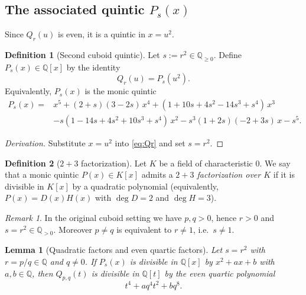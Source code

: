 \documentclass[12pt]{article}
\newtheorem{lemma}{Lemma}
\theoremstyle{remark}
\newtheorem{remark}{Remark}
\theoremstyle{definition}
\newtheorem{definition}{Definition}
\begin{document}
\subsection{The associated quintic \texorpdfstring{$P_s(x)$}{Ps(x)}}
Since $Q_r(u)$ is even, it is a quintic in $x=u^2$.

\begin{definition}[Second cuboid quintic]\label{def:Ps}
Let $s:=r^2\in\mathbb{Q}_{\ge 0}$.
Define $P_s(x)\in\mathbb{Q}[x]$ by the identity
\begin{equation}\label{eq:QrPs}
Q_r(u)=P_s(u^2).
\end{equation}
Equivalently, $P_s(x)$ is the monic quintic
\begin{equation}\label{eq:Ps}
\begin{aligned}
P_s(x)
={}&x^{5} + (2+s)(3-2s)\,x^{4} + (1+10s+4s^{2}-14s^{3}+s^{4})\,x^{3}\\
& - s(1-14s+4s^{2}+10s^{3}+s^{4})\,x^{2}
 - s^{3}(1+2s)(-2+3s)\,x
 - s^{5}.
\end{aligned}
\end{equation}
\end{definition}

\begin{proof}[Derivation]
Substitute $x=u^2$ into \eqref{eq:Qr} and set $s=r^2$.
\end{proof}

\begin{definition}[$2+3$ factorization]\label{def:23}
Let $K$ be a field of characteristic $0$.
We say that a monic quintic $P(x)\in K[x]$ admits a \emph{$2+3$ factorization over $K$} if it is divisible in $K[x]$ by a quadratic polynomial (equivalently, $P(x)=D(x)H(x)$ with $\deg D=2$ and $\deg H=3$).
\end{definition}

\begin{remark}\label{rem:domain}
In the original cuboid setting we have $p,q>0$, hence $r>0$ and $s=r^2\in\mathbb{Q}_{>0}$.
Moreover $p\neq q$ is equivalent to $r\neq 1$, i.e.\ $s\neq 1$.
\end{remark}

\begin{lemma}[Quadratic factors and even quartic factors]\label{lem:quartic}
Let $s=r^{2}$ with $r=p/q\in\mathbb{Q}$ and $q\neq 0$.
If $P_s(x)$ is divisible in $\mathbb{Q}[x]$ by $x^{2}+ax+b$ with $a,b\in\mathbb{Q}$, then $Q_{p,q}(t)$ is divisible in $\mathbb{Q}[t]$ by the even quartic polynomial
\[
t^{4}+a q^{4}t^{2}+b q^{8}.
\]
\end{lemma}
\end{document}
